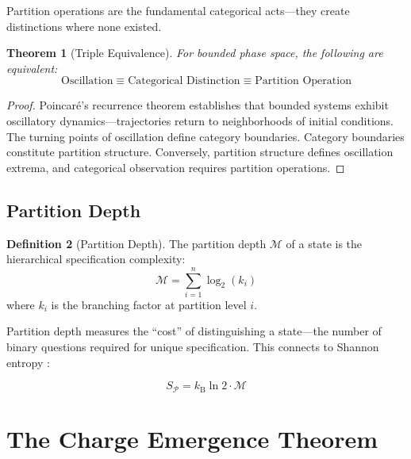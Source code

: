 \documentclass[twocolumn,10pt,a4paper]{article}
\newtheorem{theorem}{Theorem}[section]
\theoremstyle{definition}
\newtheorem{definition}[theorem]{Definition}
\theoremstyle{remark}
\newcommand{\kB}{k_{\mathrm{B}}}
\newcommand{\Depth}{\mathcal{M}}
\newcommand{\Partition}{\mathcal{P}}
\begin{document}
Partition operations are the fundamental categorical acts---they create distinctions where none existed.

\begin{theorem}[Triple Equivalence]
\label{thm:triple}
For bounded phase space, the following are equivalent:
\begin{equation}
    \text{Oscillation} \equiv \text{Categorical Distinction} \equiv \text{Partition Operation}
\end{equation}
\end{theorem}

\begin{proof}
Poincar\'{e}'s recurrence theorem \cite{poincare1890} establishes that bounded systems exhibit oscillatory dynamics---trajectories return to neighborhoods of initial conditions. The turning points of oscillation define category boundaries. Category boundaries constitute partition structure. Conversely, partition structure defines oscillation extrema, and categorical observation requires partition operations.
\end{proof}

\subsection{Partition Depth}

\begin{definition}[Partition Depth]
\label{def:depth}
The partition depth $\Depth$ of a state is the hierarchical specification complexity:
\begin{equation}
    \Depth = \sum_{i=1}^{n} \log_2(k_i)
\end{equation}
where $k_i$ is the branching factor at partition level $i$.
\end{definition}

Partition depth measures the ``cost'' of distinguishing a state---the number of binary questions required for unique specification. This connects to Shannon entropy \cite{shannon1948}:

\begin{equation}
    S_{\Partition} = \kB \ln 2 \cdot \Depth
\end{equation}

\section{The Charge Emergence Theorem}
\label{sec:charge}
\end{document}
